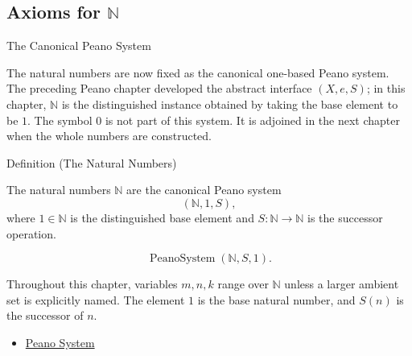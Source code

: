 \subsection{Axioms for \texorpdfstring{$\mathbb{N}$}{N}}
\label{sec:nz-axioms}

\begin{topicbox}{The Canonical Peano System}
\begin{exposition}
The natural numbers are now fixed as the canonical one-based Peano system.
The preceding Peano chapter developed the abstract interface $(X,e,S)$; in
this chapter, $\mathbb{N}$ is the distinguished instance obtained by taking
the base element to be $1$. The symbol $0$ is not part of this system. It is
adjoined in the next chapter when the whole numbers are constructed.
\end{exposition}

\begin{definitionbox}{Definition (The Natural Numbers)}
\begin{definition}
\label{def:natural-numbers}
The natural numbers $\mathbb{N}$ are the canonical Peano system
\[
(\mathbb{N},1,S),
\]
where $1 \in \mathbb{N}$ is the distinguished base element and
$S:\mathbb{N}\to\mathbb{N}$ is the successor operation.
\end{definition}
\end{definitionbox}

\begin{remark*}
\[
\operatorname{PeanoSystem}(\mathbb{N},S,1).
\]
\end{remark*}

\begin{remark*}[Interpretation]
Throughout this chapter, variables $m,n,k$ range over $\mathbb{N}$ unless a
larger ambient set is explicitly named. The element $1$ is the base natural
number, and $S(n)$ is the successor of $n$.
\end{remark*}

\begin{dependencies}
\begin{itemize}
  \item \hyperref[def:peano-system]{Peano System}
\end{itemize}
\end{dependencies}
\end{topicbox}

